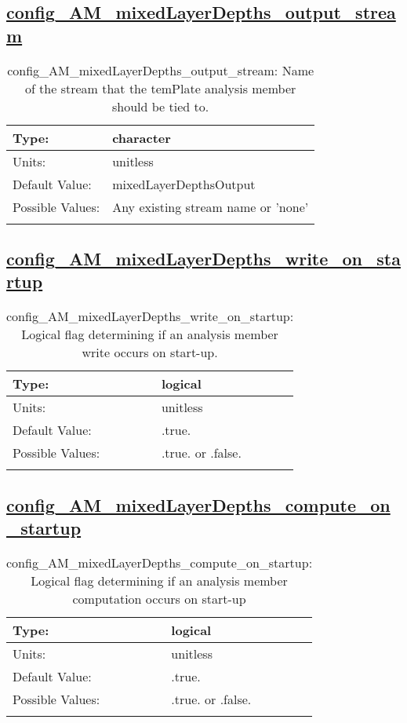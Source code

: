 \subsection[config\_AM\_mixedLayerDepths\_output\_stream]{\hyperref[sec:nm_tab_AM_mixedLayerDepths]{config\_AM\_mixedLayerDepths\_output\_stream}}
\label{subsec:nm_sec_config_AM_mixedLayerDepths_output_stream}
\begin{center}
\begin{longtable}{| p{2.0in} || p{4.0in} |}
    \hline
    Type: & character \\
    \hline
    Units: & \si{unitless} \\
    \hline
    Default Value: & mixedLayerDepthsOutput \\
    \hline
    Possible Values: & Any existing stream name or 'none' \\
    \hline
    \caption{config\_AM\_mixedLayerDepths\_output\_stream: Name of the stream that the temPlate analysis member should be tied to.}
\end{longtable}
\end{center}
\subsection[config\_AM\_mixedLayerDepths\_write\_on\_startup]{\hyperref[sec:nm_tab_AM_mixedLayerDepths]{config\_AM\_mixedLayerDepths\_write\_on\_startup}}
\label{subsec:nm_sec_config_AM_mixedLayerDepths_write_on_startup}
\begin{center}
\begin{longtable}{| p{2.0in} || p{4.0in} |}
    \hline
    Type: & logical \\
    \hline
    Units: & \si{unitless} \\
    \hline
    Default Value: & .true. \\
    \hline
    Possible Values: & .true. or .false. \\
    \hline
    \caption{config\_AM\_mixedLayerDepths\_write\_on\_startup: Logical flag determining if an analysis member write occurs on start-up.}
\end{longtable}
\end{center}
\subsection[config\_AM\_mixedLayerDepths\_compute\_on\_startup]{\hyperref[sec:nm_tab_AM_mixedLayerDepths]{config\_AM\_mixedLayerDepths\_compute\_on\_startup}}
\label{subsec:nm_sec_config_AM_mixedLayerDepths_compute_on_startup}
\begin{center}
\begin{longtable}{| p{2.0in} || p{4.0in} |}
    \hline
    Type: & logical \\
    \hline
    Units: & \si{unitless} \\
    \hline
    Default Value: & .true. \\
    \hline
    Possible Values: & .true. or .false. \\
    \hline
    \caption{config\_AM\_mixedLayerDepths\_compute\_on\_startup: Logical flag determining if an analysis member computation occurs on start-up}
\end{longtable}
\end{center}
